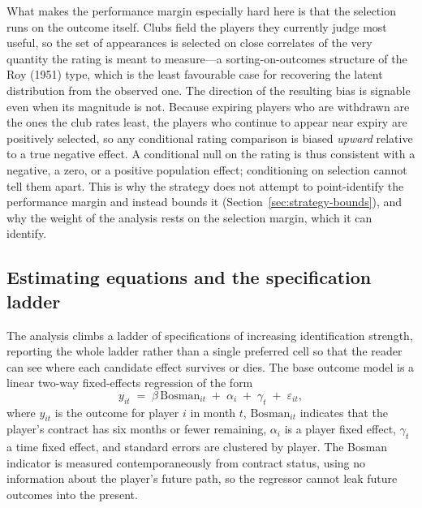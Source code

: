 \documentclass{article}
\begin{document}
What makes the performance margin especially hard here is that the selection runs
on the outcome itself. Clubs field the players they currently judge most useful, so
the set of appearances is selected on close correlates of the very quantity the
rating is meant to measure---a sorting-on-outcomes structure of the Roy (1951)
type, which is the least favourable case for recovering the latent distribution
from the observed one. The direction of the resulting bias is signable even when
its magnitude is not. Because expiring players who are withdrawn are the ones the
club rates least, the players who continue to appear near expiry are positively
selected, so any conditional rating comparison is biased \emph{upward} relative to
a true negative effect. A conditional null on the rating is thus consistent with a
negative, a zero, or a positive population effect; conditioning on selection cannot
tell them apart. This is why the strategy does not attempt to point-identify the
performance margin and instead bounds it (Section~\ref{sec:strategy-bounds}), and
why the weight of the analysis rests on the selection margin, which it can identify.

\subsection{Estimating equations and the specification ladder}
\label{sec:strategy-ladder}

The analysis climbs a ladder of specifications of increasing identification
strength, reporting the whole ladder rather than a single preferred cell so that
the reader can see where each candidate effect survives or dies. The base outcome
model is a linear two-way fixed-effects regression of the form
\[
  y_{it} \;=\; \beta\,\mathrm{Bosman}_{it} \;+\; \alpha_i \;+\; \gamma_t \;+\; \varepsilon_{it},
\]
where $y_{it}$ is the outcome for player $i$ in month $t$, $\mathrm{Bosman}_{it}$
indicates that the player's contract has six months or fewer remaining, $\alpha_i$
is a player fixed effect, $\gamma_t$ a time fixed effect, and standard errors are
clustered by player. The Bosman indicator is measured contemporaneously from
contract status, using no information about the player's future path, so the
regressor cannot leak future outcomes into the present.
\end{document}
